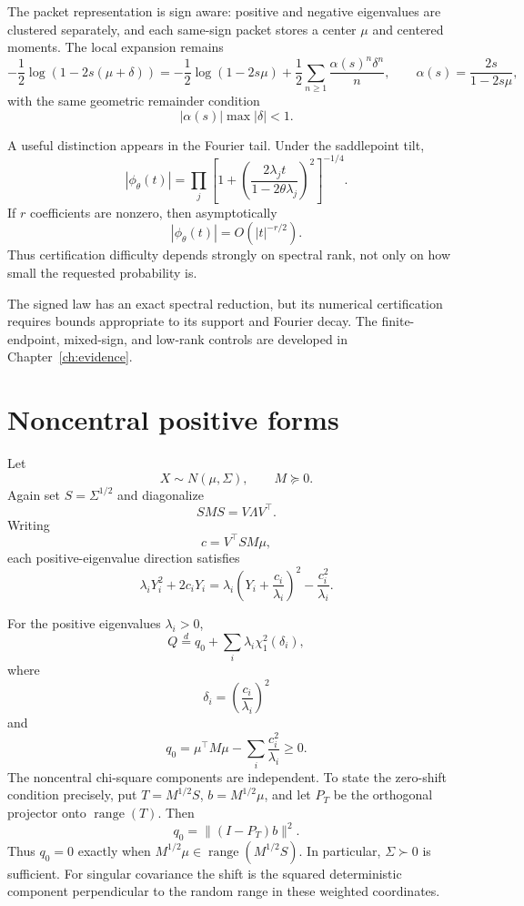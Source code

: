The packet representation is sign aware: positive and negative eigenvalues are
clustered separately, and each same-sign packet stores a center $\mu$ and
centered moments.  The local expansion remains
\[
-\frac12\log(1-2s(\mu+\delta))
=
-\frac12\log(1-2s\mu)
+
\frac12\sum_{n\ge1}
\frac{\alpha(s)^n\delta^n}{n},
\qquad
\alpha(s)=\frac{2s}{1-2s\mu},
\]
with the same geometric remainder condition
\[
|\alpha(s)|\max|\delta|<1.
\]

A useful distinction appears in the Fourier tail.  Under the saddlepoint tilt,
\[
\left|\phi_\theta(t)\right|
=
\prod_j
\left[
1+
\left(
\frac{2\lambda_j t}{1-2\theta\lambda_j}
\right)^2
\right]^{-1/4}.
\]
If $r$ coefficients are nonzero, then asymptotically
\[
|\phi_\theta(t)|=O(|t|^{-r/2}).
\]
Thus certification difficulty depends strongly on spectral rank, not only on
how small the requested probability is.

The signed law has an exact spectral reduction, but its numerical
certification requires bounds appropriate to its support and Fourier decay.
The finite-endpoint, mixed-sign, and low-rank controls are developed in
Chapter~\ref{ch:evidence}.

\section{Noncentral positive forms}

Let
\[
X\sim N(\mu,\Sigma),
\qquad
M\succeq0.
\]
Again set \(S=\Sigma^{1/2}\) and diagonalize
\[
SMS=V\Lambda V^\top.
\]
Writing
\[
c=V^\top SM\mu,
\]
each positive-eigenvalue direction satisfies
\[
\lambda_iY_i^2+2c_iY_i
=
\lambda_i
\left(
Y_i+\frac{c_i}{\lambda_i}
\right)^2
-
\frac{c_i^2}{\lambda_i}.
\]

\begin{theorem}\label{claim:final-2-3}
For the positive eigenvalues \(\lambda_i>0\),
\[
\boxed{
Q
\overset d=
q_0
+
\sum_i
\lambda_i
\chi^2_1(\delta_i),
}
\]
where
\[
\delta_i=
\left(\frac{c_i}{\lambda_i}\right)^2
\]
and
\[
q_0
=
\mu^\top M\mu
-
\sum_i\frac{c_i^2}{\lambda_i}
\ge0.
\]
The noncentral chi-square components are independent. To state the
zero-shift condition precisely, put $T=M^{1/2}S$, $b=M^{1/2}\mu$,
and let $P_T$ be the orthogonal projector onto $\operatorname{range}(T)$.
Then
\[
q_0=\|(I-P_T)b\|^2.
\]
Thus $q_0=0$ exactly when $M^{1/2}\mu\in\operatorname{range}(M^{1/2}S)$.
In particular, $\Sigma\succ0$ is sufficient. For singular covariance the
shift is the squared deterministic component perpendicular to the random
range in these weighted coordinates.
\end{theorem}

